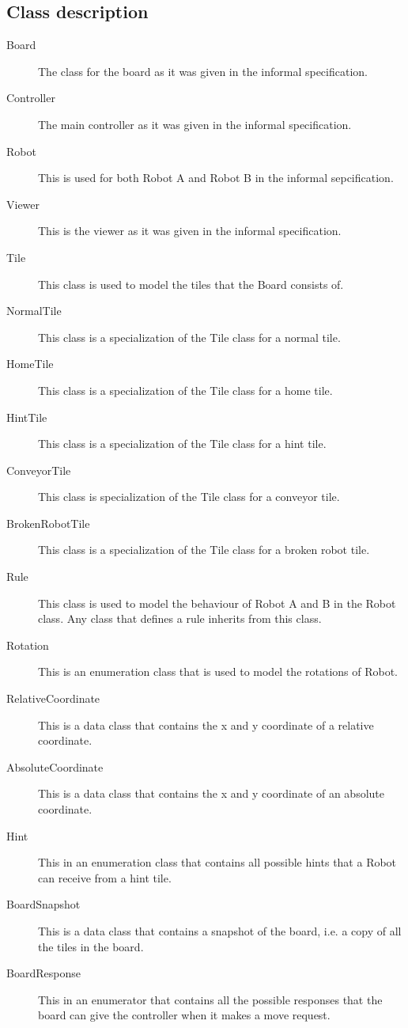 \subsection{Class description}
	\begin{description}
		\item[Board] The class for the board as it was given in the informal specification.
		\item[Controller] The main controller as it was given in the informal specification.
		\item[Robot] This is used for both Robot A and Robot B in the informal sepcification.
		\item[Viewer] This is the viewer as it was given in the informal specification.
		\item[Tile] This class is used to model the tiles that the Board consists of.
		\item[NormalTile] This class is a specialization of the Tile class for a normal tile.
		\item[HomeTile] This class is a specialization of the Tile class for a home tile.
		\item[HintTile] This class is a specialization of the Tile class for a hint tile.
		\item[ConveyorTile] This class is specialization of the Tile class for a conveyor tile.
		\item[BrokenRobotTile] This class is a specialization of the Tile class for a broken robot tile.
		\item[Rule] This class is used to model the behaviour of Robot A and B in the Robot class. Any class that defines a rule inherits from this class.
		\item[Rotation] This is an enumeration class that is used to model the rotations of Robot.
		\item[RelativeCoordinate] This is a data class that contains the x and y coordinate of a relative coordinate.
		\item[AbsoluteCoordinate] This is a data class that contains the x and y coordinate of an absolute coordinate.
		\item[Hint] This in an enumeration class that contains all possible hints that a Robot can receive from a hint tile.
		\item[BoardSnapshot] This is a data class that contains a snapshot of the board, i.e. a copy of all the tiles in the board.
		\item[BoardResponse] This in an enumerator that contains all the possible responses that the board can give the controller when it makes a move request.
	\end{description}
